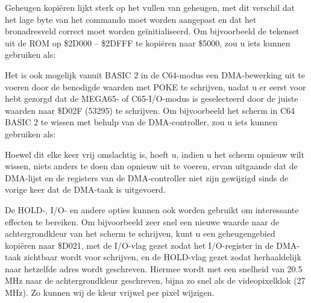 Geheugen kopiëren lijkt sterk op het vullen van geheugen, met dit verschil dat het lage byte van het commando moet worden aangepast en dat het bronadresveld correct moet worden geïnitialiseerd. Om bijvoorbeeld de tekenset uit de ROM op \$2D000 -- \$2DFFF te kopiëren naar \$5000, zou u iets kunnen gebruiken als:


Het is ook mogelijk vanuit BASIC 2 in de C64-modus een DMA-bewerking uit te voeren door de benodigde waarden met POKE te schrijven, nadat u er eerst voor hebt gezorgd dat de MEGA65- of C65-I/O-modus is geselecteerd door de juiste waarden naar \$D02F (53295) te schrijven. Om bijvoorbeeld het scherm in C64 BASIC 2 te wissen met behulp van de DMA-controller, zou u iets kunnen gebruiken als:



Hoewel dit elke keer vrij omslachtig is, hoeft u, indien u het scherm opnieuw wilt wissen, niets anders te doen dan opnieuw  uit te voeren, ervan uitgaande dat de DMA-lijst en de registers van de DMA-controller niet zijn gewijzigd sinds de vorige keer dat de DMA-taak is uitgevoerd.

De HOLD-, I/O- en andere opties kunnen ook worden gebruikt om interessante effecten te bereiken. Om bijvoorbeeld zeer snel een nieuwe waarde naar de achtergrondkleur van het scherm te schrijven, kunt u een geheugengebied kopiëren naar \$D021, met de I/O-vlag gezet zodat het I/O-register in de DMA-taak zichtbaar wordt voor schrijven, en de HOLD-vlag gezet zodat herhaaldelijk naar hetzelfde adres wordt geschreven. Hiermee wordt met een snelheid van 20.5 MHz naar de achtergrondkleur geschreven, bijna zo snel als de videopixelklok (27 MHz). Zo kunnen wij de kleur vrijwel per pixel wijzigen.


